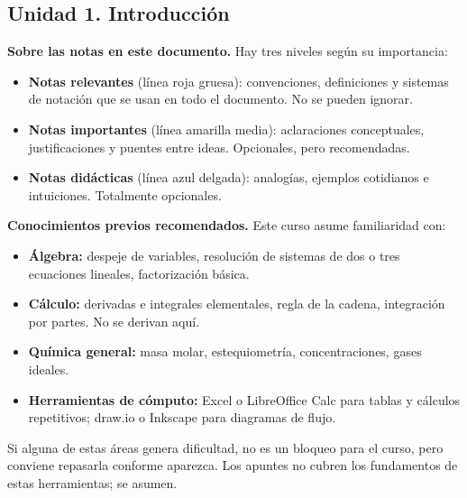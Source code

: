 {}
\begin{center}
\end{center}

{}
\subsection*{\textcolor{blueunam}{Unidad 1. Introducción}}

\begin{notadidactica}
\textbf{Sobre las notas en este documento.} Hay tres niveles según su importancia:

\begin{itemize}
    \item \textcolor{rojoNota}{\textbf{Notas relevantes}} (línea roja gruesa): 
    convenciones, definiciones y sistemas de notación que se usan en todo el 
    documento. No se pueden ignorar.
    \item \textcolor{amarilloNota}{\textbf{Notas importantes}} (línea amarilla 
    media): aclaraciones conceptuales, justificaciones y puentes entre ideas. 
    Opcionales, pero recomendadas.
    \item \textcolor{azulNota}{\textbf{Notas didácticas}} (línea azul delgada): 
    analogías, ejemplos cotidianos e intuiciones. Totalmente opcionales.
\end{itemize}
\end{notadidactica}

\begin{notaimportante}
\textbf{Conocimientos previos recomendados.} Este curso asume familiaridad con:

\begin{itemize}
    \item \textbf{Álgebra:} despeje de variables, resolución de sistemas 
    de dos o tres ecuaciones lineales, factorización básica.
    \item \textbf{Cálculo:} derivadas e integrales elementales, regla de 
    la cadena, integración por partes. No se derivan aquí.
    \item \textbf{Química general:} masa molar, estequiometría, 
    concentraciones, gases ideales.
    \item \textbf{Herramientas de cómputo:} Excel o LibreOffice Calc para 
    tablas y cálculos repetitivos; draw.io o Inkscape para diagramas de flujo.
\end{itemize}

Si alguna de estas áreas genera dificultad, no es un bloqueo para el curso,
pero conviene repasarla conforme aparezca. Los apuntes no cubren los
fundamentos de estas herramientas; se asumen.
\end{notaimportante}

